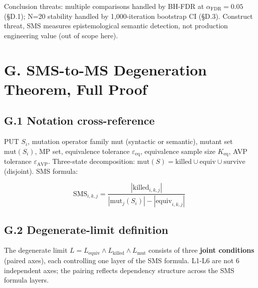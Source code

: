 \documentclass[acmsmall,screen,review]{acmart}
\begin{document}
Conclusion threats: multiple comparisons handled by BH-FDR at
$\alpha_{\mathrm{FDR}}=0.05$ (§D.1); N=20 stability handled by 1,000-iteration
bootstrap CI (§D.3). Construct threat, SMS measures epistemological
semantic detection, not production engineering value (out of scope here).


\section{G. SMS-to-MS Degeneration Theorem, Full Proof}\label{g.-sms-ms-degeneration-theorem-full-proof}

\subsection{G.1 Notation cross-reference}\label{g.1-notation-cross-reference-with-2.1}

PUT $S_i$, mutation operator family mut (syntactic or semantic),
mutant set $\mathrm{mut}(S_i)$, MP set, equivalence tolerance $\varepsilon_{\mathrm{eq}}$, equivalence
sample size $K_{\mathrm{eq}}$, AVP tolerance $\varepsilon_{\mathrm{AVP}}$. Three-state decomposition:
$\mathrm{mut}(S)=\mathrm{killed} \cup \mathrm{equiv} \cup \mathrm{survive}$ (disjoint). SMS
formula:

\[
\mathrm{SMS}_{i,k,j} = \frac{|\mathrm{killed}_{i,k,j}|}{|\mathrm{mut}_j(S_i)| - |\mathrm{equiv}_{i,k,j}|}
\]

\subsection{G.2 Degenerate-limit definition}\label{g.2-degenerate-limit-definition-r-8-p1-3-revision-3-joint-conditions}

The degenerate limit $L = L_{\mathrm{equiv}} \wedge L_{\mathrm{killed}} \wedge L_{\mathrm{mut}}$
consists of three \textbf{joint conditions} (paired axes), each
controlling one layer of the SMS formula. L1-L6 are not 6 independent
axes; the pairing reflects dependency structure across the SMS formula
layers.
\end{document}
